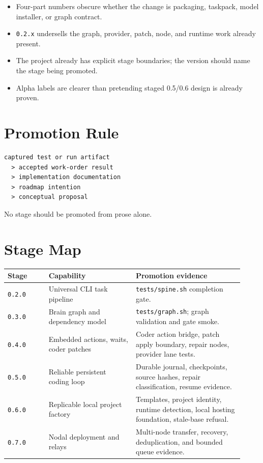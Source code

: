 \documentclass[11pt,a4paper]{article}
\begin{document}
\begin{itemize}
  \item Four-part numbers obscure whether the change is packaging, taskpack, model installer, or graph contract.
  \item \texttt{0.2.x} undersells the graph, provider, patch, node, and runtime work already present.
  \item The project already has explicit stage boundaries; the version should name the stage being promoted.
  \item Alpha labels are clearer than pretending staged 0.5/0.6 design is already proven.
\end{itemize}

\section*{Promotion Rule}

\begin{lstlisting}[language={}]
captured test or run artifact
  > accepted work-order result
  > implementation documentation
  > roadmap intention
  > conceptual proposal
\end{lstlisting}

No stage should be promoted from prose alone.

\section*{Stage Map}

\begin{longtable}{@{}p{0.16\linewidth}p{0.34\linewidth}p{0.42\linewidth}@{}}
\toprule
Stage & Capability & Promotion evidence \\
\midrule
\texttt{0.2.0} & Universal CLI task pipeline & \texttt{tests/spine.sh} completion gate. \\
\texttt{0.3.0} & Brain graph and dependency model & \texttt{tests/graph.sh}; graph validation and gate smoke. \\
\texttt{0.4.0} & Embedded actions, waits, coder patches & Coder action bridge, patch apply boundary, repair nodes, provider lane tests. \\
\texttt{0.5.0} & Reliable persistent coding loop & Durable journal, checkpoints, source hashes, repair classification, resume evidence. \\
\texttt{0.6.0} & Replicable local project factory & Templates, project identity, runtime detection, local hosting foundation, stale-base refusal. \\
\texttt{0.7.0} & Nodal deployment and relays & Multi-node transfer, recovery, deduplication, and bounded queue evidence. \\
\bottomrule
\end{longtable}
\end{document}
